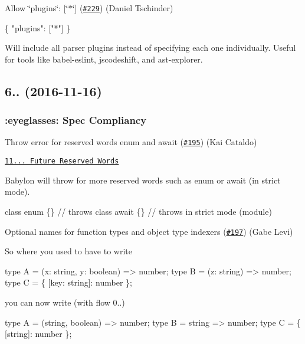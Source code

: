 Allow {\ttfamily \char`\"{}plugins\char`\"{}\+: \mbox{[}\char`\"{}$\ast$\char`\"{}\mbox{]}} (\href{https://github.com/babel/babylon/pull/229}{\tt \#229}) (Daniel Tschinder)


\begin{DoxyCode}
\{
  "plugins": ["*"]
\}
\end{DoxyCode}


Will include all parser plugins instead of specifying each one individually. Useful for tools like babel-\/eslint, jscodeshift, and ast-\/explorer.

\subsection*{6.. (2016-\/11-\/16)}

\subsubsection*{\+:eyeglasses\+: Spec Compliancy}

Throw error for reserved words {\ttfamily enum} and {\ttfamily await} (\href{https://github.com/babel/babylon/pull/195}{\tt \#195}) (Kai Cataldo)

\href{http://www.ecma-international.org/ecma-262/6.0/#sec-future-reserved-words}{\tt 11... Future Reserved Words}

Babylon will throw for more reserved words such as {\ttfamily enum} or {\ttfamily await} (in strict mode).


\begin{DoxyCode}
class enum \{\} // throws
class await \{\} // throws in strict mode (module)
\end{DoxyCode}


Optional names for function types and object type indexers (\href{https://github.com/babel/babylon/pull/197}{\tt \#197}) (Gabe Levi)

So where you used to have to write


\begin{DoxyCode}
type A = (x: string, y: boolean) => number;
type B = (z: string) => number;
type C = \{ [key: string]: number \};
\end{DoxyCode}


you can now write (with flow 0..)


\begin{DoxyCode}
type A = (string, boolean) => number;
type B = string => number;
type C = \{ [string]: number \};
\end{DoxyCode}


